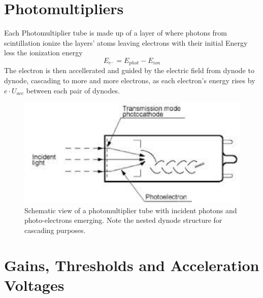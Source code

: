   \section{Photomultipliers}
  \label{ch:The muon detection system:sec:Photomultipliers}
  Each Photomultiplier tube is made up of a layer of  where photons from scintillation ionize the layers' atoms leaving electrons with their initial Energy less the ionization energy 
  $$E_{e^-} = E_{phot} - E_{ion}$$
  The electron is then accellerated and guided by the electric field from dynode to dynode, cascading to more and more electrons, as each electron's energy rises by $e\cdot U_{acc}$ between each pair of dynodes.
  \begin{figure}
  	\centering
  	\includegraphics[width = 0.5 \textwidth]{graphics/setup/PMT.pdf}
  	\caption[Photomultiplier tube]{Schematic view of a photomultiplier tube with incident photons and photo-electrons emerging. Note the nested dynode structure for cascading purposes.}
  \end{figure}

  
  
  \section{Gains, Thresholds and Acceleration Voltages}
  \label{ch:The muon detection system:sec:Gains, Thresholds and Acceleration Voltages}


